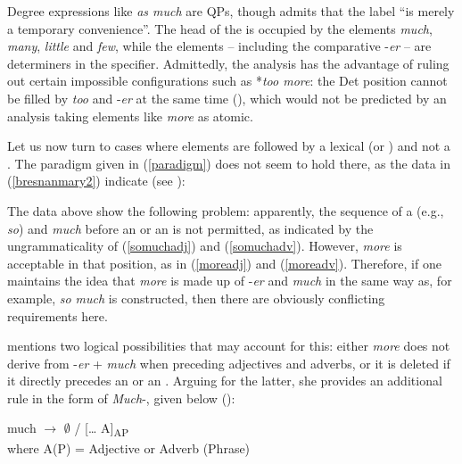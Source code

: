Degree expressions like \textit{as much} are QPs, though \citet[277]{bresnan1973} admits that the label ``is merely a temporary convenience''. The head of the  is occupied by the elements \textit{much}, \textit{many}, \textit{little} and \textit{few}, while the  elements -- including the comparative -\textit{er} -- are determiners in the specifier. Admittedly, the analysis has the advantage of ruling out certain impossible configurations such as *\textit{too more}: the Det position cannot be filled by \textit{too} and -\textit{er} at the same time (\citealt[277]{bresnan1973}), which would not be predicted by an analysis taking elements like \textit{more} as atomic.

Let us now turn to cases where  elements are followed by a lexical  (or ) and not a . The paradigm given in (\ref{paradigm}) does not seem to hold there, as the data in (\ref{bresnanmary2}) indicate (see \citealt[278, exx. 8 and 9]{bresnan1973}):

\ea \label{bresnanmary2}
 \label{moreadj}
 \label{somuchadj}
 \label{moreadv}
 \label{somuchadv}
\z
\z

The data above show the following problem: apparently, the sequence of a  (e.g., \textit{so}) and \textit{much} before an  or an  is not permitted, as indicated by the ungrammaticality of (\ref{somuchadj}) and (\ref{somuchadv}). However, \textit{more} is acceptable in that position, as in (\ref{moreadj}) and (\ref{moreadv}). Therefore, if one maintains the idea that \textit{more} is made up of -\textit{er} and \textit{much} in the same way as, for example, \textit{so much} is constructed, then there are obviously conflicting requirements here.

\citet[278]{bresnan1973} mentions two logical possibilities that may account for this: either \textit{more} does not derive from -\textit{er} + \textit{much} when preceding adjectives and adverbs, or it is deleted if it directly precedes an  or an . Arguing for the latter, she provides an additional rule in the form of \textit{Much}-, given below (\citealt[278, ex. 10]{bresnan1973}):

\ea \upshape much $\rightarrow$ $\emptyset$ / [\ldots \underline{\hspace{1cm}} A]\textsubscript{AP}\\where A(P) = Adjective or Adverb (Phrase) \label{muchdeletion}
\z

